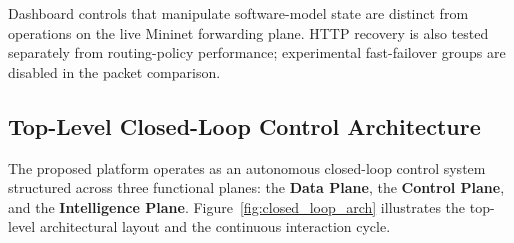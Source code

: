 \documentclass[12pt,a4paper,oneside]{report}
\begin{document}
Dashboard controls that manipulate software-model state are distinct from operations on the live Mininet forwarding plane. HTTP recovery is also tested separately from routing-policy performance; experimental fast-failover groups are disabled in the packet comparison.


\subsection{Top-Level Closed-Loop Control Architecture}
The proposed platform operates as an autonomous closed-loop control system structured across three functional planes: the \textbf{Data Plane}, the \textbf{Control Plane}, and the \textbf{Intelligence Plane}. Figure~\ref{fig:closed_loop_arch} illustrates the top-level architectural layout and the continuous interaction cycle.
\end{document}
